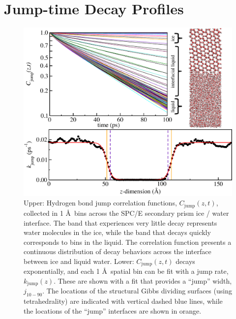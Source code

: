 \section{Jump-time Decay Profiles}
\begin{figure}
\includegraphics[width=5.5in]{Figures/secPrismJumpPlot}
\caption{\label{fig:SPkjmp} Upper: Hydrogen bond jump correlation
  functions, $C_\mathrm{jump}(z,t)$, collected in 1 \AA~bins across
  the SPC/E secondary prism ice / water interface. The band that
  experiences very little decay represents water molecules in the ice,
  while the band that decays quickly corresponds to bins in the
  liquid.  The correlation function presents a continuous distribution
  of decay behaviors across the interface between ice and liquid
  water.  Lower: $C_\mathrm{jump}(z,t)$ decays exponentially, and each
  1 \AA~spatial bin can be fit with a jump rate, $k_\mathrm{jump}(z)$.
  These are shown with a fit that provides a ``jump'' width,
  $j_\mathrm{10-90}$. The locations of the structural Gibbs dividing
  surfaces (using tetrahedrality) are indicated with vertical dashed
  blue lines, while the locations of the ``jump'' interfaces are shown in
  orange.}
\end{figure}



